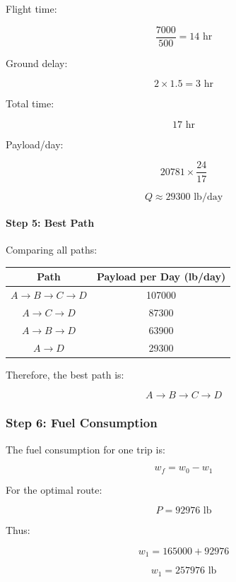 \documentclass{KPS_assignment}
\begin{document}
Flight time:

\[
\frac{7000}{500}=14 \text{ hr}
\]

Ground delay:

\[
2\times1.5=3 \text{ hr}
\]

Total time:

\[
17 \text{ hr}
\]

Payload/day:

\[
20781\times\frac{24}{17}
\]

\[
\boxed{
Q\approx29300 \text{ lb/day}
}
\]


\paragraph{Step 5: Best Path}

Comparing all paths:

\begin{center}
\begin{tabular}{|c|c|}
\hline
Path & Payload per Day (lb/day) \\
\hline
\(A\rightarrow B\rightarrow C\rightarrow D\) & 107000 \\
\(A\rightarrow C\rightarrow D\) & 87300 \\
\(A\rightarrow B\rightarrow D\) & 63900 \\
\(A\rightarrow D\) & 29300 \\
\hline
\end{tabular}
\end{center}

Therefore, the best path is:

\[
\boxed{
A\rightarrow B\rightarrow C\rightarrow D
}
\]


\subsubsection{Step 6: Fuel Consumption}

The fuel consumption for one trip is:

\[
w_f=w_0-w_1
\]

For the optimal route:

\[
P=92976 \text{ lb}
\]

Thus:

\[
w_1=165000+92976
\]

\[
w_1=257976 \text{ lb}
\]
\end{document}
